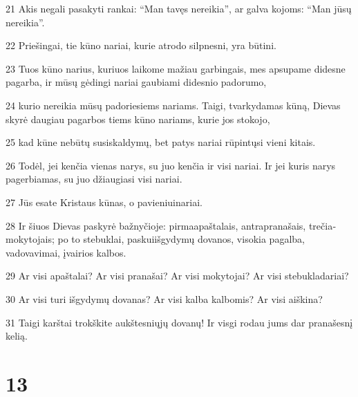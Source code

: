 \par 21 Akis negali pasakyti rankai: “Man tavęs nereikia”, ar galva kojoms: “Man jūsų nereikia”. 
\par 22 Priešingai, tie kūno nariai, kurie atrodo silpnesni, yra būtini. 
\par 23 Tuos kūno narius, kuriuos laikome mažiau garbingais, mes apsupame didesne pagarba, ir mūsų gėdingi nariai gaubiami didesnio padorumo, 
\par 24 kurio nereikia mūsų padoriesiems nariams. Taigi, tvarkydamas kūną, Dievas skyrė daugiau pagarbos tiems kūno nariams, kurie jos stokojo, 
\par 25 kad kūne nebūtų susiskaldymų, bet patys nariai rūpintųsi vieni kitais. 
\par 26 Todėl, jei kenčia vienas narys, su juo kenčia ir visi nariai. Ir jei kuris narys pagerbiamas, su juo džiaugiasi visi nariai. 
\par 27 Jūs esate Kristaus kūnas, o pavieniui­nariai. 
\par 28 Ir šiuos Dievas paskyrė bažnyčioje: pirma­apaštalais, antra­pranašais, trečia­mokytojais; po to­ stebuklai, paskui­išgydymų dovanos, visokia pagalba, vadovavimai, įvairios kalbos. 
\par 29 Ar visi apaštalai? Ar visi pranašai? Ar visi mokytojai? Ar visi stebukladariai? 
\par 30 Ar visi turi išgydymų dovanas? Ar visi kalba kalbomis? Ar visi aiškina? 
\par 31 Taigi karštai trokškite aukštesniųjų dovanų! Ir visgi rodau jums dar pranašesnį kelią.


\chapter{13}


